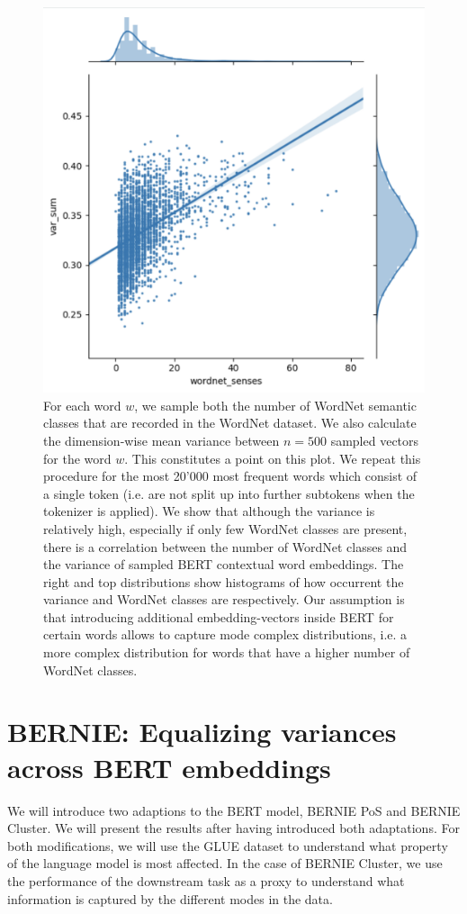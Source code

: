 \documentclass[a4paper,12pt,oneside,openright]{report}
\begin{document}
\begin{figure}[H]
	\center
  \includegraphics[width=0.5\linewidth]{./assets/experiments/variance_in_BERT_embeddings.png}
  \caption{
  	For each word $w$, we sample both the number of WordNet semantic classes that are recorded in the WordNet dataset. We also calculate the dimension-wise mean variance between $n=500$ sampled vectors for the word $w$. 
  	This constitutes a point on this plot.
  	We repeat this procedure for the most 20'000 most frequent words which consist of a single token (i.e. are not split up into further subtokens when the tokenizer is applied).
	We show that although the variance is relatively high, especially if only few WordNet classes are present, there is a correlation between the number of WordNet classes and the variance of sampled BERT contextual word embeddings.
	The right and top distributions show histograms of how occurrent the variance and WordNet classes are respectively.
	Our assumption is that introducing additional embedding-vectors inside BERT for certain words allows to capture mode complex distributions, i.e. a more complex distribution for words that have a higher number of WordNet classes.
  }
  \label{fig:BERT_variance}
\end{figure}

\section{BERNIE: Equalizing variances across BERT embeddings}

We will introduce two adaptions to the BERT model, BERNIE PoS and BERNIE Cluster.
We will present the results after having introduced both adaptations.
For both modifications, we will use the GLUE dataset to understand what property of the language model is most affected.
In the case of BERNIE Cluster, we use the performance of the downstream task as a proxy to understand what information is captured by the different modes in the data.
\end{document}

